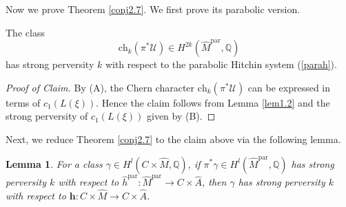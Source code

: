 \documentclass[11pt]{amsart}
\theoremstyle{plain}
\newtheorem{lem}[thm]{Lemma}
\theoremstyle{definition}
\theoremstyle{remark}
\newcommand{\BQ}{{\mathbb{Q}}}
\newcommand{\CU}{{\mathcal U}}
\begin{document}
Now we prove Theorem \ref{conj2.7}. We first prove its parabolic version.

\medskip
{} The class
\[
\mathrm{ch}_k\left(\pi^* \CU\right) \in H^{2k}(\widehat{M}^{\mathrm{par}}, \BQ)
\]
has strong perversity $k$ with respect to the parabolic Hitchin system (\ref{parah}).

\begin{proof}[Proof of Claim]
By (A), the Chern character $\mathrm{ch}_k(\pi^*\CU)$ can be expressed in terms of $c_1(L(\xi))$. Hence the claim follows from Lemma \ref{lem1.2} and the strong perversity of $c_1(L(\xi))$ given by (B).
\end{proof}


Next, we reduce Theorem \ref{conj2.7} to the claim above via the following lemma.

\begin{lem}
For a class $\gamma \in H^l(C \times \widehat{M}, \BQ)$, if $\pi^*\gamma \in H^l(\widehat{M}^{\mathrm{par}}, \BQ)$ has strong perversity $k$ with respect to $\widehat{h}^{\mathrm{par}}: \widehat{M}^{\mathrm{par}} \to C\times \widehat{A}$, then $\gamma$ has strong perversity $k$ with respect to ${\mathbf{h}} : C\times \widehat{M} \to C\times \widehat{A}$.
\end{lem}
\end{document}
